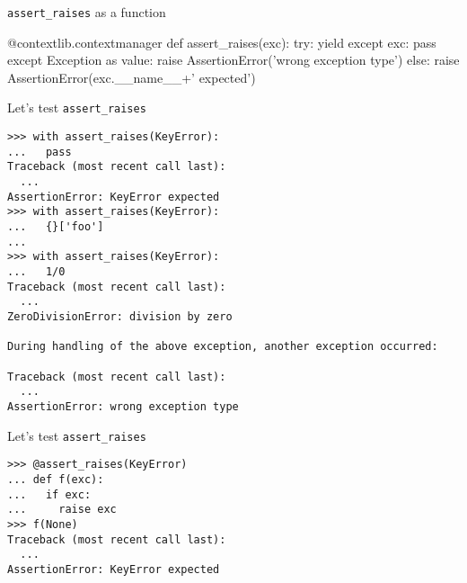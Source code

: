 \documentclass{beamer}
\begin{document}
\begin{frame}[fragile]{\texttt{assert\_raises} as a function}
  \begin{pycode}
    @contextlib.contextmanager
    def assert_raises(exc):
        try:
            yield
        except exc:
            pass
        except Exception as value:
            raise AssertionError('wrong exception type')
        else:
            raise AssertionError(exc.__name__+' expected')
  \end{pycode}
\end{frame}

\begin{frame}[fragile]{Let's test \texttt{assert\_raises}}
  \begin{verbatim}
>>> with assert_raises(KeyError):
...   pass
Traceback (most recent call last):
  ...
AssertionError: KeyError expected
>>> with assert_raises(KeyError):
...   {}['foo']
...
>>> with assert_raises(KeyError):
...   1/0
Traceback (most recent call last):
  ...
ZeroDivisionError: division by zero

During handling of the above exception, another exception occurred:

Traceback (most recent call last):
  ...
AssertionError: wrong exception type
  \end{verbatim}
\end{frame}

\begin{frame}[fragile]{Let's test \texttt{assert\_raises}}
  \begin{verbatim}
>>> @assert_raises(KeyError)
... def f(exc):
...   if exc:
...     raise exc
>>> f(None)
Traceback (most recent call last):
  ...
AssertionError: KeyError expected
  \end{verbatim}
\end{frame}




\end{document}
